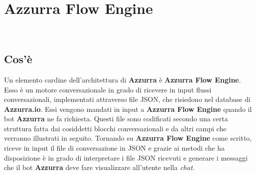 
\chapter{Azzurra Flow Engine}
\label{cap:flow engine}
\\


\section{Cos'è}
Un elemento cardine dell'architettura di \textbf{Azzurra} è \textbf{Azzurra Flow Engine}. Esso è un motore conversazionale in grado di ricevere in input flussi conversazionali, implementati attraverso file JSON, che risiedono nel database di \textbf{Azzurra.io}. Essi vengono mandati in input a \textbf{Azzurra Flow Engine} quando il bot \textbf{Azzurra} ne fa richiesta. Questi file sono codificati secondo una certa struttura fatta dai cosiddetti blocchi conversazionali e da altri campi che verranno illustrati in seguito. Tornando su \textbf{Azzurra Flow Engine} come scritto, riceve in input il file di conversazione in JSON e grazie ai metodi che ha disposizione è in grado di interpretare i file JSON ricevuti e generare i messaggi che il bot \textbf{Azzurra} deve fare visualizzare all'utente nella \emph{chat}.

